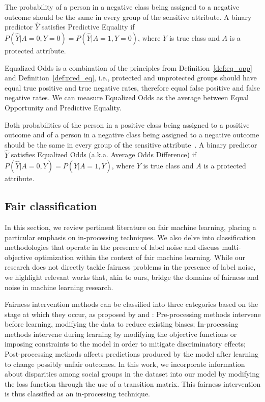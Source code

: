 \begin{definition}\label{def:pred_eq}
The probability of a person in a negative class being assigned to a negative outcome should be the same in every group of the sensitive attribute. A binary predictor $\hat{Y}$ satisfies Predictive Equality if $P(\hat{Y}|A=0,Y=0) = P(\hat{Y}|A=1,Y=0)$, where $Y$ is true class and $A$ is a protected attribute.
\end{definition}

Equalized Odds is a combination of the principles from Definition~\ref{def:eq_opp} and Definition~\ref{def:pred_eq}, i.e., protected and unprotected groups should have equal true positive and true negative rates, therefore equal false positive and false negative rates. We can measure Equalized Odds as the average between Equal Opportunity and Predictive Equality.

\begin{definition}\label{def:eq_odds}
Both probabilities of the person in a positive class being assigned to a positive outcome and of a person in a negative class being assigned to a negative outcome should be the same in every group of the sensitive attribute~\citep{Hardt2016}. A binary predictor $\hat{Y}$ satisfies Equalized Odds (a.k.a. Average Odds Difference) if $P(\hat{Y}|A=0,Y) = P(\hat{Y}|A=1,Y)$, where $Y$ is true class and $A$ is a protected attribute.
\end{definition}

\subsection{Fair classification}

In this section, we review pertinent literature on fair machine learning, placing a particular emphasis on in-processing techniques. We also delve into classification methodologies that operate in the presence of label noise and discuss multi-objective optimization within the context of fair machine learning. While our research does not directly tackle fairness problems in the presence of label noise, we highlight relevant works that, akin to ours, bridge the domains of fairness and noise in machine learning research. 

Fairness intervention methods can be classified into three categories based on the stage at which they occur, as proposed by \cite{Mehrabi2019} and \cite{AlerTubella2022}: Pre-processing methods intervene before learning, modifying the data to reduce existing biases; In-processing methods intervene during learning by modifying the objective functions or imposing constraints to the model in order to mitigate discriminatory effects; Post-processing methods affects predictions produced by the model after learning to change possibly unfair outcomes. In this work, we incorporate information about disparities among social groups in the dataset into our model by modifying the loss function through the use of a transition matrix. This fairness intervention is thus classified as an in-processing technique.

